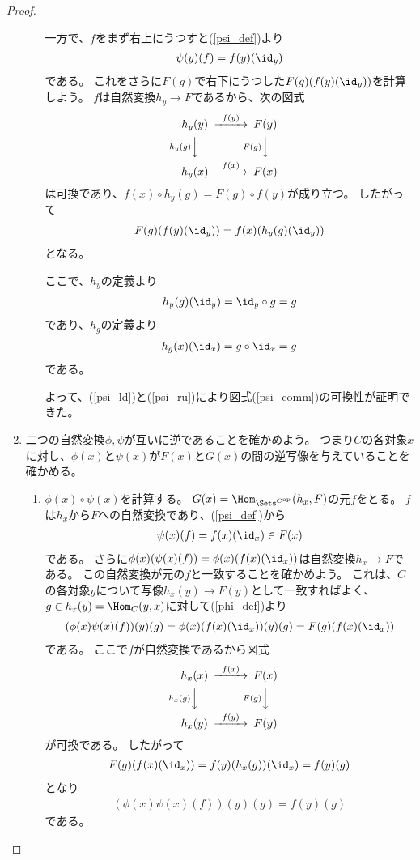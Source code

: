 \documentclass[uplatex]{jsarticle}
\begin{document}
\begin{proof}
\begin{enumerate}
\begin{enumerate}
一方で、$f$をまず右上にうつすと(\ref{psi_def})より
\begin{align*}
\psi(y)(f)=f(y)(\id_y)
\end{align*}
である。
これをさらに$F(g)$で右下にうつした$F(g)(f(y)(\id_y))$を計算しよう。
$f$は自然変換$h_y \to F$であるから、次の図式
\[
\begin{CD}
h_y(y)@>f(y)>>F(y)\\
@Vh_y(g)VV@VF(g)VV\\
h_y(x)@>f(x)>>F(x)
\end{CD}
\]
は可換であり、$f(x)\circ h_y(g)=F(g)\circ f(y)$が成り立つ。
したがって
\begin{align}\label{psi_ru}
F(g)(f(y)(\id_y))=f(x)(h_y(g)(\id_y))
\end{align}
となる。

ここで、$h_y$の定義より
\begin{align*}
h_y(g)(\id_y)=\id_y\circ g=g
\end{align*}
であり、$h_g$の定義より
\begin{align*}
h_g(x)(\id_x)=g\circ\id_x=g
\end{align*}
である。

よって、(\ref{psi_ld})と(\ref{psi_ru})により図式(\ref{psi_comm})の可換性が証明できた。
\end{enumerate}

\item 二つの自然変換$\phi, \psi$が互いに逆であることを確かめよう。
つまり$C$の各対象$x$に対し、$\phi(x)$と$\psi(x)$が$F(x)$と$G(x)$の間の逆写像を与えていることを確かめる。

\begin{enumerate}
\item $\phi(x)\circ\psi(x)$を計算する。
$G(x)=\Hom_{\Sets^{C^{\rm op}}}(h_x,F)$の元$f$をとる。
$f$は$h_x$から$F$への自然変換であり、(\ref{psi_def})から
\begin{align*}
\psi(x)(f)=f(x)(\id_x)\in F(x)
\end{align*}
である。
さらに$\phi(x)(\psi(x)(f))=\phi(x)(f(x)(\id_x))$は自然変換$h_x \to F$である。
この自然変換が元の$f$と一致することを確かめよう。
これは、$C$の各対象$y$について写像$h_x(y) \to F(y)$として一致すればよく、
$g\in h_x(y)=\Hom_C(y,x)$に対して(\ref{phi_def})より
\begin{align*}
(\phi(x)\psi(x)(f))(y)(g)=\phi(x)(f(x)(\id_x))(y)(g)=F(g)(f(x)(\id_x))
\end{align*}
である。
ここで$f$が自然変換であるから図式
\[
\begin{CD}
h_x(x)@>f(x)>>F(x)\\
@Vh_x(g)VV@VF(g)VV\\
h_x(y)@>f(y)>>F(y)
\end{CD}
\]
が可換である。
したがって
\begin{align*}
F(g)(f(x)(\id_x))=f(y)(h_x(g))(\id_x)=f(y)(g)
\end{align*}
となり
\begin{align*}
(\phi(x)\psi(x)(f))(y)(g)=f(y)(g)
\end{align*}
である。


\end{enumerate}
\end{enumerate}
\end{proof}
\end{document}
